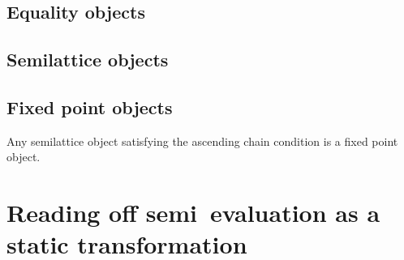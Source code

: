 \documentclass{rntz}
\begin{document}
\subsection{Equality objects}

\subsection{Semilattice objects}

\subsection{Fixed point objects}

Any semilattice object satisfying the ascending chain condition is a fixed point
object. 


\section{Reading off semi\naive\ evaluation as a static transformation}

\XXX
\end{document}
